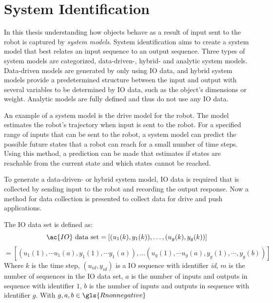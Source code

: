 \section{System Identification}%
\label{sec:sys_iden}
In this thesis understanding how objects behave as a result of input sent to the robot is captured by \textit{system models}. System identification aims to create a system model that best relates an input sequence to an output sequence. Three types of system models are categorized, data-driven-, hybrid- and analytic system models. Data-driven models are generated by only using \ac{IO} data, and hybrid system models provide a predetermined structure between the input and output with several variables to be determined by \ac{IO} data, such as the object's dimensions or weight. Analytic models are fully defined and thus do not use any \ac{IO} data.\bs

An example of a system model is the drive model for the robot. The model estimates the robot's trajectory when input is sent to the robot. For a specified range of inputs that can be sent to the robot, a system model can predict the possible future states that a robot can reach for a small number of time steps. Using this method, a prediction can be made that estimates if states are reachable from the current state and which states cannot be reached.\bs

To generate a data-driven- or hybrid system model, \ac{IO} data is required that is collected by sending input to the robot and recording the output response. Now a method for data collection is presented to collect data for drive and push applications.\bs

The \ac{IO} data set is defined as:
\[ \ac{IO} \textrm{ data set} = \left[(u_1(k), y_1(k)), \dots, (u_g(k), y_g(k)) \right]\]
\[= \left[(u_1(1), \cdots u_1(a), y_1(1), \cdots y_1(a)), \dots (u_g(1), \cdots u_g(a), y_g(1), \cdots, y_g(b)) \right]\]
Where $k$ is the time step, $(u_\mathit{id}, y_\mathit{id})$ is a \ac{IO} sequence with identifier \textit{id}, $m$ is the number of sequences in the \ac{IO} data set, $a$ is the number of inputs and outputs in sequence with identifier $1$, $b$ is the number of inputs and outputs in sequence with identifier $g$. With $g, a, b \in \gls{Rnonnegative}$\bs

